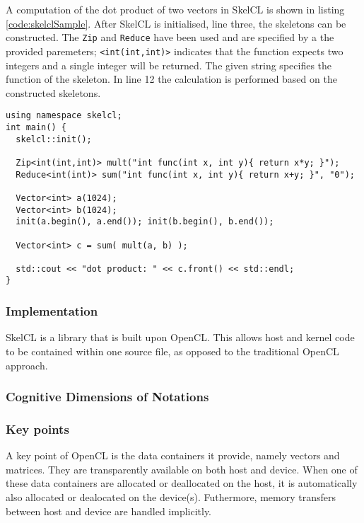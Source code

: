 A computation of the dot product of two vectors in SkelCL is shown in listing \ref{code:skelclSample}. After SkelCL is initialised, line three, the skeletons can be constructed. The \texttt{Zip} and \texttt{Reduce} have been used and are specified by a the provided paremeters; \texttt{<int(int,int)>} indicates that the function expects two integers and a single integer will be returned. The given string specifies the function of the skeleton. In line 12 the calculation is performed based on the constructed skeletons.

\begin{lstlisting}[caption={Computation of the dot product of two vectors}, label=code:skelclSample] 
using namespace skelcl;
int main() {
  skelcl::init();

  Zip<int(int,int)> mult("int func(int x, int y){ return x*y; }");
  Reduce<int(int)> sum("int func(int x, int y){ return x+y; }", "0");

  Vector<int> a(1024);
  Vector<int> b(1024);
  init(a.begin(), a.end()); init(b.begin(), b.end());

  Vector<int> c = sum( mult(a, b) );

  std::cout << "dot product: " << c.front() << std::endl;
}
\end{lstlisting}

\subsubsection{Implementation}
SkelCL is a library that is built upon OpenCL. This allows host and kernel code to be contained within one source file, as opposed to the traditional OpenCL approach.

\subsubsection{Cognitive Dimensions of Notations}

\subsubsection{Key points}
A key point of OpenCL is the data containers it provide, namely vectors and matrices. They are transparently available on both host and device. When one of these data containers are allocated or deallocated on the host, it is automatically also allocated or dealocated on the device(s). Futhermore, memory transfers between host and device are handled implicitly.

